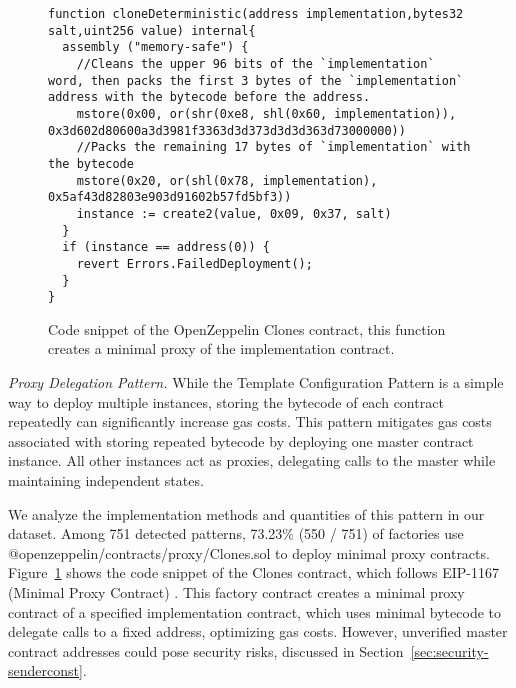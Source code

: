 \documentclass[acmsmall,screen]{acmart}
\begin{document}
	\begin{figure}[h]
		\begin{minipage}{\linewidth}
			\begin{lstlisting}
function cloneDeterministic(address implementation,bytes32 salt,uint256 value) internal{
  assembly ("memory-safe") {
    //Cleans the upper 96 bits of the `implementation` word, then packs the first 3 bytes of the `implementation` address with the bytecode before the address.
    mstore(0x00, or(shr(0xe8, shl(0x60, implementation)), 0x3d602d80600a3d3981f3363d3d373d3d3d363d73000000))
    //Packs the remaining 17 bytes of `implementation` with the bytecode
    mstore(0x20, or(shl(0x78, implementation), 0x5af43d82803e903d91602b57fd5bf3))
    instance := create2(value, 0x09, 0x37, salt)
  }
  if (instance == address(0)) {
    revert Errors.FailedDeployment();
  }
}
			\end{lstlisting}
		\end{minipage}
		\caption{Code snippet of the OpenZeppelin Clones contract, this function creates a minimal proxy of the implementation contract.}
		\label{list:clone}
	\end{figure}




	\textit{Proxy Delegation Pattern.} While the Template Configuration Pattern is a simple way to deploy multiple instances, storing the bytecode of each contract repeatedly can significantly increase gas costs. This pattern mitigates gas costs associated with storing repeated bytecode by deploying one master contract instance. All other instances act as proxies, delegating calls to the master while maintaining independent states.

	We analyze the implementation methods and quantities of this pattern in our dataset. Among 751 detected patterns, 73.23\% (550 / 751) of factories use @openzeppelin/contracts/proxy/Clones.sol to deploy minimal proxy contracts. Figure~\ref{list:clone} shows the code snippet of the Clones contract, which follows EIP-1167 (Minimal Proxy Contract) \cite{eip-1167}. This factory contract creates a minimal proxy contract of a specified implementation contract, which uses minimal bytecode to delegate calls to a fixed address, optimizing gas costs. However, unverified master contract addresses could pose security risks, discussed in Section~\ref{sec:security-senderconst}.

	
\end{document}
